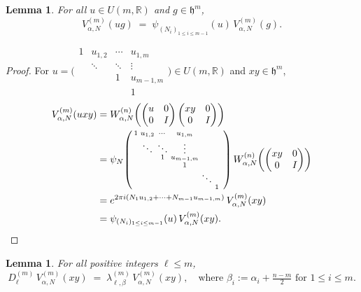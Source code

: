 \documentclass[12pt, reqno, oneside]{amsart}
\newtheorem{lemma}[theorem]{Lemma}
\theoremstyle{definition}
\numberwithin{equation}{section}
\newcommand{\R}{\mathbb{R}}
\newcommand{\hh}{\mathfrak{h}}
\begin{document}
\begin{lemma}\label{lem:equivariance}
For all $u\in U(m,\R)$ and $g\in\hh^m$,
\[
  V_{\alpha,N}^{(m)}(ug)
  \;=\;
  \psi_{(N_i)_{1\leq i\leq m-1}}(u)\,V_{\alpha,N}^{(m)}(g).
\]
\end{lemma}

\begin{proof}
For $u=\bigl(\begin{smallmatrix}1&u_{1,2}&\cdots&u_{1,m}\\&\ddots&\ddots&\vdots\\&&1&u_{m-1,m}\\&&&1\end{smallmatrix}\bigr)\in U(m,\R)$
and $xy\in\hh^m$,
\begin{align*}
  V_{\alpha,N}^{(m)}(uxy)
  &= W_{\alpha,N}^{(n)}\!\left(\begin{pmatrix}u&0\\0&I\end{pmatrix}
    \begin{pmatrix}xy&0\\0&I\end{pmatrix}\right) \\
  &= \psi_N\!\left(
    \begin{smallmatrix}
      1&u_{1,2}&\cdots&u_{1,m}&&&\\
      &\ddots&\ddots&\vdots&&\\
      &&1&u_{m-1,m}&&\\
      &&&1&&\\
      &&&&\ddots&\\
      &&&&&1
    \end{smallmatrix}
    \right)
    W_{\alpha,N}^{(n)}\!\left(\begin{pmatrix}xy&0\\0&I\end{pmatrix}\right)\\
  &= e^{2\pi i(N_1 u_{1,2}+\cdots+N_{m-1}u_{m-1,m})}\,
     V_{\alpha,N}^{(m)}(xy) \\
  &= \psi_{(N_i)_{1\leq i\leq m-1}}(u)\,V_{\alpha,N}^{(m)}(xy).\qedhere
\end{align*}
\end{proof}

\begin{lemma}\label{lem:eigenfunction}
For all positive integers $\ell\leq m$,
\[
  D_\ell^{(m)}\,V_{\alpha,N}^{(m)}(xy)
  \;=\;
  \lambda_{\ell,\beta}^{(m)}\,V_{\alpha,N}^{(m)}(xy),
  \quad\text{where }\beta_i := \alpha_i + \tfrac{n-m}{2}
  \text{ for } 1\leq i\leq m.
\]
\end{lemma}
\end{document}
